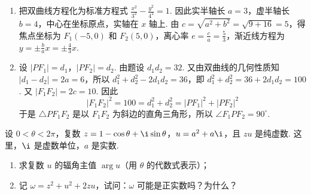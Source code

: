\documentclass[UTF8,a4paper,oneside,11pt]{ctexbook}
\begin{document}
\begin{solution}
\begin{enumerate}
\item 把双曲线方程化为标准方程式 \(\frac{x^2}{3^2}-\frac{y^2}{4^2}=1\). 因此实半轴长 \(a=3\)，虚半轴长 \(b=4\)，中心在坐标原点，实轴在 \(x\) 轴上. 由 \(c=\sqrt{a^2+b^2}=\sqrt{9+16}=5\)，得焦点坐标为 \(F_1(-5,0)\) 和 \(F_2(5,0)\)，离心率 \(e=\frac{c}{a}=\frac{5}{3}\)，渐近线方程为 \(y=\pm\frac{b}{a}x=\pm\frac{4}{3}x\).
\end{enumerate}


\begin{enumerate}
\setcounter{enumi}{1}
\item 设 \(\left|PF_1\right|=d_1\)，\(\left|PF_2\right|=d_2\). 由题设 \(d_1d_2=32\). 又由双曲线的几何性质知 \(\left|d_1-d_2\right|=2a=6\)，所以 \(d_1^2+d_2^2-2d_1d_2=36\)，即 \(d_1^2+d_2^2=36+2d_1d_2=100\). 又 \(\left|F_1F_2\right|=2c=10\). 因此
\[
\left|F_1F_2\right|^2=100=d_1^2+d_2^2=\left|PF_1\right|^2+\left|PF_2\right|^2
\]
于是 \(\triangle PF_1F_2\) 是以 \(F_1F_2\) 为斜边的直角三角形，所以 \(\angle F_1PF_2=90^{\circ}\).
\end{enumerate}
\end{solution}

\begin{problem}
设 \(0 < \theta < 2\pi\)，复数 \(z = 1 - \cos \theta + \i \sin \theta\)，\(u = a^2 + a\i\)，且 \(zu\) 是纯虚数. 这里，\(\i\) 是虚数单位，\(a\) 是实数.
\begin{enumerate}
\item 求复数 \(u\) 的辐角主值 \(\arg u\)（用 \(\theta\) 的代数式表示）；
\item 记 \(\omega = z^2 + u^2 + 2zu\)，试问：\(\omega\) 可能是正实数吗？为什么？
\end{enumerate}
\end{problem}
\end{document}
